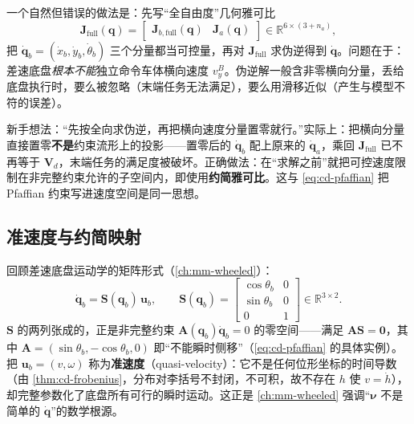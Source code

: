 一个自然但错误的做法是：先写“全自由度”几何雅可比
\begin{equation}
  \mathbf{J}_{\text{full}}(\mathbf{q})=\begin{bmatrix}\mathbf{J}_{b,\text{full}}(\mathbf{q})&\mathbf{J}_a(\mathbf{q})\end{bmatrix}\in\mathbb{R}^{6\times(3+n_a)},
  \label{eq:mmk-Jfull}
\end{equation}
把 $\dot{\mathbf{q}}_b=(\dot x_b,\dot y_b,\dot\theta_b)$ 三个分量都当可控量，再对 $\mathbf{J}_{\text{full}}$ 求伪逆得到 $\dot{\mathbf{q}}$。问题在于：差速底盘\emph{根本不能}独立命令车体横向速度 $v_y^B$。伪逆解一般含非零横向分量，丢给底盘执行时，要么被忽略（末端任务无法满足），要么用滑移近似（产生与模型不符的误差）。

\begin{pitfall}
新手想法：“先按全向求伪逆，再把横向速度分量置零就行。”实际上：把横向分量直接置零\textbf{不是}约束流形上的投影——置零后的 $\dot{\mathbf{q}}_b$ 配上原来的 $\dot{\mathbf{q}}_a$，乘回 $\mathbf{J}_{\text{full}}$ 已不再等于 $\mathbf{V}_d$，末端任务的满足度被破坏。正确做法：在“求解之前”就把可控速度限制在非完整约束允许的子空间内，即使用\textbf{约简雅可比}。这与 \cref{eq:cd-pfaffian} 把 Pfaffian 约束写进速度空间是同一思想。
\end{pitfall}

\subsection{准速度与约简映射}
\label{sec:mmk-quasivel}

回顾差速底盘运动学的矩阵形式（\cref{ch:mm-wheeled}）：
\begin{equation}
  \dot{\mathbf{q}}_b=\mathbf{S}(\mathbf{q}_b)\,\mathbf{u}_b,\qquad
  \mathbf{S}(\mathbf{q}_b)=\begin{bmatrix}\cos\theta_b&0\\\sin\theta_b&0\\0&1\end{bmatrix}\in\mathbb{R}^{3\times2}.
  \label{eq:mmk-S}
\end{equation}
$\mathbf{S}$ 的两列张成的，正是非完整约束 $\mathbf{A}(\mathbf{q}_b)\dot{\mathbf{q}}_b=0$ 的零空间——满足 $\mathbf{A}\mathbf{S}=\mathbf{0}$，其中 $\mathbf{A}=(\sin\theta_b,-\cos\theta_b,0)$ 即“不能瞬时侧移”（\cref{eq:cd-pfaffian} 的具体实例）。把 $\mathbf{u}_b=(v,\omega)$ 称为\textbf{准速度}（quasi-velocity）：它不是任何位形坐标的时间导数（由 \cref{thm:cd-frobenius}，分布对李括号不封闭，不可积，故不存在 $h$ 使 $v=\dot h$），却完整参数化了底盘所有可行的瞬时运动。这正是 \cref{ch:mm-wheeled} 强调“$\boldsymbol{\nu}$ 不是简单的 $\dot{\mathbf{q}}$”的数学根源。

